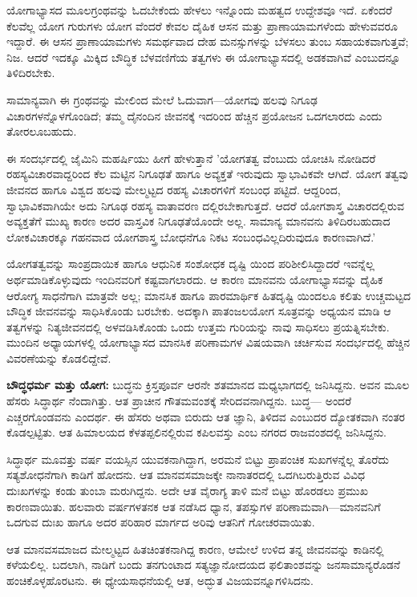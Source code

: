 ಯೋಗಾಭ್ಯಾಸದ ಮೂಲಗ್ರಂಥವನ್ನು ಓದಬೇಕೆಂದು ಹೇಳಲು ಇನ್ನೊಂದು ಮಹತ್ವದ ಉದ್ದೇಶವೂ ಇದೆ. ಏಕೆಂದರೆ ಕೆಲವೆಲ್ಲ ಯೋಗ ಗುರುಗಳು ಯೋಗ ವೆಂದರೆ ಕೇವಲ ದೈಹಿಕ ಆಸನ ಮತ್ತು ಪ್ರಾಣಾಯಾಮಗಳೆಂದು ಹೇಳುವವರೂ ಇದ್ದಾರೆ. ಈ ಆಸನ ಪ್ರಾಣಾಯಾಮಗಳು ಸಮರ್ಥವಾದ ದೇಹ ಮನಸ್ಸುಗಳನ್ನು ಬೆಳಸಲು ತುಂಬ ಸಹಾಯಕವಾಗುತ್ತವೆ; ನಿಜ. ಆದರೆ ಇದಕ್ಕೂ ಮಿಕ್ಕಿದ ಬೌದ್ಧಿಕ ಬೆಳವಣಿಗೆಯ ತತ್ವಗಳು ಈ ಯೋಗಾಭ್ಯಾಸದಲ್ಲಿ ಅಡಕವಾಗಿವೆ ಎಂಬುದನ್ನೂ ತಿಳಿದಿರಬೇಕು.

ಸಾಮಾನ್ಯವಾಗಿ ಈ ಗ್ರಂಥವನ್ನು ಮೇಲಿಂದ ಮೇಲೆ ಓದುವಾಗ—ಯೋಗವು ಹಲವು ನಿಗೂಢ ವಿಚಾರಗಳನ್ನೊಳಗೊಂಡಿದೆ; ತಮ್ಮ ದೈನಂದಿನ ಜೀವನಕ್ಕೆ ಇದರಿಂದ ಹೆಚ್ಚಿನ ಪ್ರಯೋಜನ ಒದಗಲಾರದು ಎಂದು ತೋರಲೂಬಹುದು.

ಈ ಸಂದರ್ಭದಲ್ಲಿ ಜೈಮಿನಿ ಮಹರ್ಷಿಯು ಹೀಗೆ ಹೇಳುತ್ತಾನೆ 'ಯೋಗತತ್ವ ವೆಂಬುದು ಯೋಚಿಸಿ ನೋಡಿದರೆ ರಹಸ್ಯವಿಚಾರವಾದ್ದರಿಂದ ಕೆಲ ಮಟ್ಟಿನ ನಿಗೂಢತೆ ಹಾಗೂ ಅವ್ಯಕ್ತತೆ ಇರುವುದು ಸ್ವಾಭಾವಿಕವೇ ಆಗಿದೆ. ಯೋಗ ತತ್ವವು ಜೀವನದ ಹಾಗೂ ವಿಶ್ವದ ಹಲವು ಮೇಲ್ಮಟ್ಟದ ರಹಸ್ಯ ವಿಚಾರಗಳಿಗೆ ಸಂಬಂಧ ಪಟ್ಟಿದೆ. ಆದ್ದರಿಂದ, ಸ್ವಾಭಾವಿಕವಾಗಿಯೇ ಅದು ನಿಗೂಢ ರಹಸ್ಯ ವಾತಾವರಣ ದಲ್ಲಿರಬೇಕಾಗುತ್ತದೆ. ಆದರೆ ಯೋಗಶಾಸ್ತ್ರ ವಿಚಾರದಲ್ಲಿರುವ ಅವ್ಯಕ್ತತೆಗೆ ಮುಖ್ಯ ಕಾರಣ ಅದರ ವಾಸ್ತವಿಕ ನಿಗೂಢತೆಯೊಂದೇ ಅಲ್ಲ. ಸಾಮಾನ್ಯ ಮಾನವನು ತಿಳಿದಿರಬಹುದಾದ ಲೋಕವಿಚಾರಕ್ಕೂ ಗಹನವಾದ ಯೋಗಶಾಸ್ತ್ರ ಬೋಧನೆಗೂ ನಿಕಟ ಸಂಬಂಧವಿಲ್ಲದಿರುವುದೂ ಕಾರಣವಾಗಿದೆ.'

ಯೋಗತತ್ವವನ್ನು ಸಾಂಪ್ರದಾಯಿಕ ಹಾಗೂ ಆಧುನಿಕ ಸಂಶೋಧಕ ದೃಷ್ಟಿ ಯಿಂದ ಪರಿಶೀಲಿಸಿದ್ದಾದರೆ ಇವನ್ನೆಲ್ಲ ಅರ್ಥಮಾಡಿಕೊಳ್ಳುವುದು ಇಂದಿನವರಿಗೆ ಕಷ್ಟವಾಗಲಾರದು. ಆ ಕಾರಣ ಮಾನವನು ಯೋಗಾಭ್ಯಾಸವನ್ನು ದೈಹಿಕ ಆರೋಗ್ಯ ಸಾಧನೆಗಾಗಿ ಮಾತ್ರವೇ ಅಲ್ಲ; ಮಾನಸಿಕ ಹಾಗೂ ಪಾರಮಾರ್ಥಿಕ ಹಿತದೃಷ್ಟಿ ಯಿಂದಲೂ ಕಲಿತು ಉಚ್ಚಮಟ್ಟದ ಬೌದ್ಧಿಕ ಜೀವನವನ್ನು ಸಾಧಿಸಿಕೊಂಡು ಬರಬೇಕು. ಅದಕ್ಕಾಗಿ ಪಾತಂಜಲಯೋಗ ಸೂತ್ರವನ್ನು ಅಧ್ಯಯನ ಮಾಡಿ ಆ ತತ್ವಗಳನ್ನು ನಿತ್ಯಜೀವನದಲ್ಲಿ ಅಳವಡಿಸಿಕೊಂಡು ಒಂದು ಉತ್ತಮ ಗುರಿಯನ್ನು ನಾವು ಸಾಧಿಸಲು ಪ್ರಯತ್ನಿಸಬೇಕು. ಮುಂದಿನ ಅಧ್ಯಾಯಗಳಲ್ಲಿ ಯೋಗಾಭ್ಯಾಸದ ಮಾನಸಿಕ ಪರಿಣಾಮಗಳ ವಿಷಯವಾಗಿ ಚರ್ಚಿಸುವ ಸಂದರ್ಭದಲ್ಲಿ ಹೆಚ್ಚಿನ ವಿವರಣೆಯನ್ನು ಕೊಡಲಿದ್ದೇವೆ.

\textbf{ಬೌದ್ಧಧರ್ಮ ಮತ್ತು ಯೋಗ:} ಬುದ್ಧನು ಕ್ರಿಸ್ತಪೂರ್ವ ಆರನೇ ಶತಮಾನದ ಮಧ್ಯಭಾಗದಲ್ಲಿ ಜನಿಸಿದ್ದನು. ಅವನ ಮೂಲ ಹೆಸರು ಸಿದ್ಧಾರ್ಥ ನೆಂದಾಗಿತ್ತು. ಆತ ಪ್ರಾಚೀನ ಗೌತಮವಂಶಕ್ಕೆ ಸೇರಿದವನಾಗಿದ್ದನು. ಬುದ್ಧ— ಅಂದರೆ ಎಚ್ಚರಗೊಂಡವನು ಎಂದರ್ಥ. ಈ ಹೆಸರು ಅಥವಾ ಬಿರುದು ಆತ ಜ್ಞಾನಿ, ತಿಳಿದವ ಎಂಬುದರ ದ್ಯೋತಕವಾಗಿ ನಂತರ ಕೊಡಲ್ಪಟ್ಟಿತು. ಆತ ಹಿಮಾಲಯದ ಕೆಳತಪ್ಪಲಿನಲ್ಲಿರುವ ಕಪಿಲವಸ್ತು ಎಂಬ ನಗರದ ರಾಜವಂಶದಲ್ಲಿ ಜನಿಸಿದ್ದನು.

ಸಿದ್ಧಾರ್ಥ ಮೂವತ್ತು ವರ್ಷ ವಯಸ್ಸಿನ ಯುವಕನಾಗಿದ್ದಾಗ, ಅರಮನೆ ಬಿಟ್ಟು ಪ್ರಾಪಂಚಿಕ ಸುಖಗಳನ್ನೆಲ್ಲ ತೊರೆದು ಸತ್ಯಶೋಧನೆಗಾಗಿ ಕಾಡಿಗೆ ಹೋದನು. ಆತ ಮಾನವಸಮಾಜಕ್ಕೇ ನಾನಾತರದಲ್ಲಿ ಒದಗಿಬರುತ್ತಿರುವ ವಿವಿಧ ದುಃಖಗಳನ್ನು ಕಂಡು ತುಂಬಾ ಮರುಗಿದ್ದನು. ಅದೇ ಆತ ವೈರಾಗ್ಯ ತಾಳಿ ಮನೆ ಬಿಟ್ಟು ಹೊರಡಲು ಪ್ರಮುಖ ಕಾರಣವಾಯಿತು. ಹಲವಾರು ವರ್ಷಗಳತನಕ ಆತ ನಡೆಸಿದ ಧ್ಯಾನ, ತಪಸ್ಸುಗಳ ಪರಿಣಾಮವಾಗಿ—ಮಾನವನಿಗೆ ಒದಗುವ ದುಃಖ ಹಾಗೂ ಅದರ ಪರಿಹಾರ ಮಾರ್ಗದ ಅರಿವು ಆತನಿಗೆ ಗೋಚರವಾಯಿತು.

ಆತ ಮಾನವಸಮಾಜದ ಮೇಲ್ಮಟ್ಟದ ಹಿತಚಿಂತಕನಾಗಿದ್ದ ಕಾರಣ, ಆಮೇಲೆ ಉಳಿದ ತನ್ನ ಜೀವನವನ್ನು ಕಾಡಿನಲ್ಲಿ ಕಳೆಯಲಿಲ್ಲ. ಬದಲಾಗಿ, ನಾಡಿಗೆ ಬಂದು ತನಗುಂಟಾದ ಸತ್ಯಜ್ಞಾನೋದಯದ ಫಲಿತಾಂಶವನ್ನು ಜನಸಾಮಾನ್ಯರೊಡನೆ ಹಂಚಿಕೊಳ್ಳಹೊರಟನು. ಈ ಧ್ಯೇಯಸಾಧನೆಯಲ್ಲಿ ಆತ, ಅದ್ಭುತ ವಿಜಯವನ್ನೂಗಳಿಸಿದನು.

